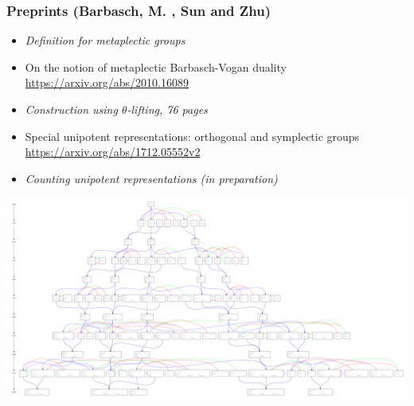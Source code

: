 \documentclass[t,serif,11pt,handout,usenames,dvipsnames]{beamer}
\theoremstyle{plain}
\theoremstyle{definition}
\def\blue{\color{blue}}
\let\oldemph\emph
\def\emph#1{\oldemph{\blue #1}}
\begin{document}
    \begin{frame}
      \frametitle{Preprints (Barbasch, M. ,  Sun and  Zhu)}
        \vfill
        \begin{itemize}
          \item \emph{Definition for metaplectic groups}
          \item[]
   	On the notion of metaplectic Barbasch-Vogan duality
        \href{https://arxiv.org/abs/2010.16089}{https://arxiv.org/abs/2010.16089}
          \item \emph{Construction using $\theta$-lifting, 76 pages}
          \item[]
        Special unipotent representations: orthogonal and symplectic groups\\
        \href{https://arxiv.org/abs/1712.05552v2}{https://arxiv.org/abs/1712.05552v2}
          \item \emph{Counting unipotent representations (in preparation)}
        \vfill
         \end{itemize}
    \end{frame}

    \begin{frame}{}

       \vfill
        \vfill
        \includegraphics[width=\textwidth]{lifttreeC1_10.pdf}
      \end{frame}

  
\end{document}
